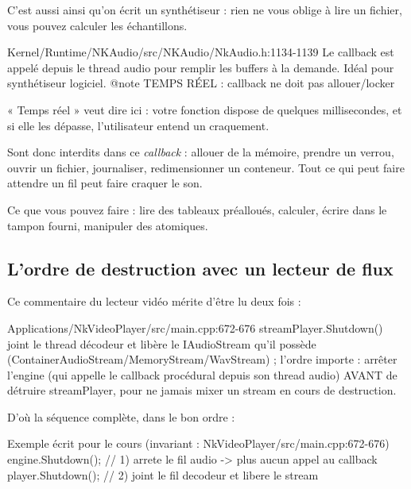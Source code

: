 C'est aussi ainsi qu'on écrit un synthétiseur : rien ne vous oblige à lire un
fichier, vous pouvez calculer les échantillons.

\begin{nkpiege}
\begin{nkcode}{Kernel/Runtime/NKAudio/src/NKAudio/NkAudio.h:1134-1139}
 Le callback est appelé depuis le thread audio pour remplir
 les buffers à la demande. Idéal pour synthétiseur logiciel.
 @note TEMPS RÉEL : callback ne doit pas allouer/locker
\end{nkcode}

« Temps réel » veut dire ici : votre fonction dispose de quelques millisecondes,
et si elle les dépasse, l'utilisateur entend un craquement.

Sont donc interdits dans ce \emph{callback} : allouer de la mémoire, prendre un
verrou, ouvrir un fichier, journaliser, redimensionner un conteneur. Tout ce qui
peut faire attendre un fil peut faire craquer le son.

Ce que vous pouvez faire : lire des tableaux préalloués, calculer, écrire dans
le tampon fourni, manipuler des atomiques.
\end{nkpiege}

\subsection{L'ordre de destruction avec un lecteur de flux}

Ce commentaire du lecteur vidéo mérite d'être lu deux fois :

\begin{nkcode}{Applications/NkVideoPlayer/src/main.cpp:672-676}
 streamPlayer.Shutdown() joint le thread décodeur et libère le IAudioStream
 qu'il possède (ContainerAudioStream/MemoryStream/WavStream) ; l'ordre importe :
 arrêter l'engine (qui appelle le callback procédural depuis son thread audio)
 AVANT de détruire streamPlayer, pour ne jamais mixer un stream en cours de
 destruction.
\end{nkcode}

D'où la séquence complète, dans le bon ordre :

\begin{nkcode}{Exemple écrit pour le cours (invariant : NkVideoPlayer/src/main.cpp:672-676)}
engine.Shutdown();     // 1) arrete le fil audio -> plus aucun appel au callback
player.Shutdown();     // 2) joint le fil decodeur et libere le stream
\end{nkcode}

